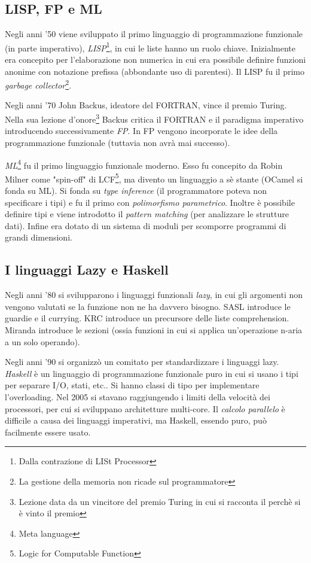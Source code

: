 
\subsection{LISP, FP e ML}

Negli anni '50 viene sviluppato il primo linguaggio di programmazione funzionale (in parte imperativo), \textit{LISP}\footnote{Dalla contrazione di LISt Processor}, in cui le liste hanno un ruolo chiave. Inizialmente era concepito per l'elaborazione non numerica in cui era possibile definire funzioni anonime con notazione prefissa (abbondante uso di parentesi). Il LISP fu il primo \textit{garbage collector}\footnote{La gestione della memoria non ricade sul programmatore}.

Negli anni '70 John Backus, ideatore del FORTRAN, vince il premio Turing. Nella sua lezione d'onore\footnote{Lezione data da un vincitore del premio Turing in cui si racconta il perchè si è vinto il premio} Backus critica il FORTRAN e il paradigma imperativo introducendo successivamente \textit{FP}. In FP vengono incorporate le idee della programmazione funzionale (tuttavia non avrà mai successo).

\textit{ML}\footnote{Meta language} fu il primo linguaggio funzionale moderno. Esso fu concepito da Robin Milner come "spin-off" di LCF\footnote{Logic for Computable Function}, ma divento un linguaggio a sè stante (OCamel si fonda su ML). Si fonda su \textit{type inference} (il programmatore poteva non specificare i tipi) e fu il primo con \textit{polimorfismo parametrico}. Inoltre è possibile definire tipi e viene introdotto il \textit{pattern matching} (per analizzare le strutture dati). Infine era dotato di un sistema di moduli per scomporre programmi di grandi dimensioni. 

\subsection{I linguaggi Lazy e Haskell}

Negli anni '80 si svilupparono i linguaggi funzionali \textit{lazy}, in cui gli argomenti non vengono valutati se la funzione non ne ha davvero bisogno. SASL introduce le guardie e il currying. KRC introduce un precursore delle liste comprehension. Miranda introduce le sezioni (ossia funzioni in cui si applica un'operazione n-aria a un solo operando).

Negli anni '90 si organizzò un comitato per standardizzare i linguaggi lazy. \textit{Haskell} è un linguaggio di programmazione funzionale puro in cui si usano i tipi per separare I/O, stati, etc.. Si hanno classi di tipo per implementare l'overloading. Nel 2005 si stavano raggiungendo i limiti della velocità dei processori, per cui si sviluppano architetture multi-core. Il \textit{calcolo parallelo} è difficile a causa dei linguaggi imperativi, ma Haskell, essendo puro, può facilmente essere usato. 